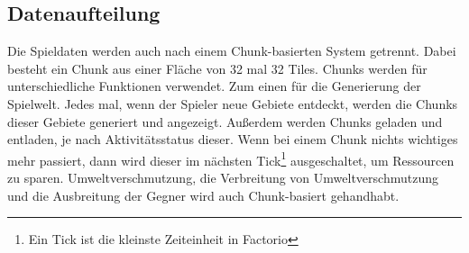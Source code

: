\subsection{Datenaufteilung} \label{ssec:factorioDatenaufteilung}
Die Spieldaten werden auch nach einem Chunk-basierten System getrennt. Dabei besteht ein Chunk aus einer Fläche von 32 mal 32 Tiles. Chunks werden für unterschiedliche Funktionen verwendet. Zum einen für die Generierung der Spielwelt. Jedes mal, wenn der Spieler neue Gebiete entdeckt, werden die Chunks dieser Gebiete generiert und angezeigt. Außerdem werden Chunks geladen und entladen, je nach Aktivitätsstatus dieser. Wenn bei einem Chunk nichts wichtiges mehr passiert, dann wird dieser im nächsten Tick\footnote{Ein Tick ist die kleinste Zeiteinheit in Factorio\cite{factorioTime}} ausgeschaltet, um Ressourcen zu sparen. Umweltverschmutzung, die Verbreitung von Umweltverschmutzung und die Ausbreitung der Gegner wird auch Chunk-basiert gehandhabt. 
\cite{factorioMapStructure}

